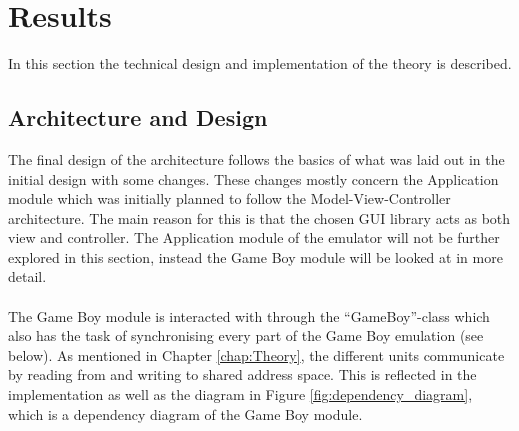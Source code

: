 \chapter{Results}


In this section the technical design and implementation of the theory is described.
\section{Architecture and Design}
\label{sec:resultsarchitecture}
The final design of the architecture follows the basics of what was laid out in the initial design with some changes. These changes mostly concern the Application module which was initially planned to follow the Model-View-Controller architecture. The main reason for this is that the chosen GUI library acts as both view and controller. The Application module of the emulator will not be further explored in this section, instead the Game Boy module will be looked at in more detail.
\\\\
The Game Boy module is interacted with through the ``GameBoy''-class which also has the task of synchronising every part of the Game Boy emulation (see below). As mentioned in Chapter \ref{chap:Theory}, the different units communicate by reading from and writing to shared address space. This is reflected in the implementation as well as the diagram in Figure \ref{fig:dependency_diagram}, which is a dependency diagram of the Game Boy module.
